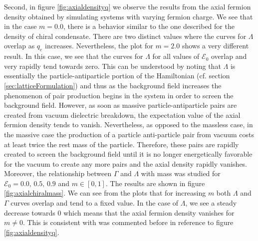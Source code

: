 Second, in figure \ref{fig:axialdensityq} we observe the results from the axial fermion density obtained by simulating systems with varying fermion charge. We see that in the case $m=0.0$, there is a behavior similar to the one described for the density of chiral condensate. There are two distinct values where the curves for $\Lambda$ overlap as $q_e$ increases. Nevertheless, the plot for $m=2.0$ shows a very different result. In this case, we see that the curves for $\Lambda$ for all values of $\mathcal{E}_0$ overlap and very rapidly tend towards zero. This can be understood by noting that $\Lambda$ is essentially the particle-antiparticle portion of the Hamiltonian (cf. section \ref{sec:latticeFormulation}) and thus as the background field increases the phenomenon of pair production begins in the system in order to screen the background field. However, as soon as massive particle-antiparticle pairs are created from vacuum dielectric breakdown, the expectation value of the axial fermion density tends to vanish. Nevertheless, as opposed to the massless case, in the massive case the production of a particle anti-particle pair from vacuum costs at least twice the rest mass of the particle. Therefore, these pairs are rapidly created to screen the background field until it is no longer energetically favorable for the vacuum to create any more pairs and the axial density rapidly vanishes.\\

Moreover, the relationship between $\Gamma$ and $\Lambda$ with mass was studied for $\mathcal{E}_0=0.0,\,0.5,\,0.9$ and $m\in[0,1]$. The results are shown in figure \ref{fig:axialchiralmass}. We can see from the plots that for increasing $m$ both $\Lambda$ and $\Gamma$ curves overlap and tend to a fixed value. In the case of $\Lambda$, we see a steady decrease towards $0$ which means that the axial fermion density vanishes for $m\neq0$. This is consistent with was commented before in reference to figure \ref{fig:axialdensityq}.\\

